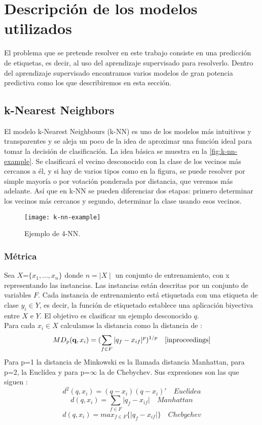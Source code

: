 \section{Descripción de los modelos utilizados}\label{st:modelos-utilizados}
El problema que se pretende resolver en este trabajo consiste en una predicción de etiquetas, es decir, al uso del aprendizaje supervisado para resolverlo. Dentro del aprendizaje supervisado encontramos varios modelos de gran potencia predictiva como los que describiremos en esta sección.
\subsection{k-Nearest Neighbors}\label{sst:k-nn}
El modelo k-Nearest Neighbours (k-NN) es uno de los modelos más intuitivos y transparentes y se aleja un poco de la idea de aproximar una función ideal para tomar la decisión de clasificación. La idea básica se muestra en la \autoref{fig:k-nn-example}. Se clasificará el vecino desconocido con la clase de los vecinos más cercanos a él, y si hay de varios tipos como en la figura, se puede resolver por simple mayoría o por votación ponderada por distancia, que veremos más adelante. Así que en k-NN se pueden diferenciar dos etapas: primero determinar los vecinos más cercanos y segundo, determinar la clase usando esos vecinos. \cite{padraiddelany2007k}

\begin{figure}[H]
  \centering
  \texttt{[image: k-nn-example]}
  \caption{Ejemplo de 4-NN.}
  \label{fig:k-nn-example}
\end{figure}
\begin{center}
\cite{peterson2009k}
\end{center}

\subsubsection{Métrica}
Sea $X$=$\lbrace x_{1},...,x_{n} \rbrace$ donde $n=\mid X \mid$ un conjunto de entrenamiento, con x representando las instancias. Las instancias están descritas por un conjunto de variables $F$. Cada instancia de entrenamiento está etiquetada con una etiqueta de clase $y_{i} \in Y$, es decir, la función de etiquetado establece una aplicación biyectiva entre $X$ e $Y$. El objetivo es clasificar un ejemplo desconocido \textbf{$q$}.\cite{padraiddelany2007k}\\
Para cada $x_{i} \in X$ calculamos la distancia como la distancia de :
\[ MD_{p}(\textbf{q},x_{i})= (\sum_{f \in F}  \vert q_{f} - x_{if} \vert ^{p})^{1/p} \quad \cite{inproceedings} \] 
Para p=1 la distancia de Minkowski es la llamada distancia Manhattan, para p=2, la Euclídea y para p=$\infty$ la de Chebychev. Sus expresiones son las que siguen \cite{inproceedings}:
\[ d^{2}(q,x_{i})= (q-x_{i})(q-x_{i})' \quad Euclídea \]
\[ d(q,x_{i})=\sum_{f \in F}  \vert q_{f} - x_{if} \vert \quad  Manhattan \]
\[ d(q,x_{i})=max_{f \in F} \lbrace \vert q_{f} - x_{if} \vert \rbrace \quad Chebychev \]

